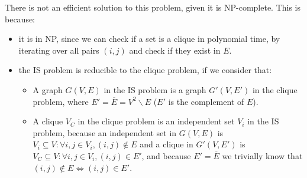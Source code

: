 \documentclass{cal}
\begin{document}
{There is not an efficient solution to this problem, given it is NP-complete. This is because:
\begin{itemize}
    \item it is in NP, since we can check if a set is a clique in polynomial time, by iterating over all pairs $(i,j)$ and check if they exist in $E$.
    \item the IS problem is reducible to the clique problem, if we consider that:
    \begin{itemize}
        \item A graph $G(V,E)$ in the IS problem is a graph $G'(V,E')$ in the clique problem, where $E' = \overline{E} = V^2 \backslash E$ ($E'$ is the complement of $E$).
        \item A clique $V_C$ in the clique problem is an independent set $V_i$ in the IS problem, because an independent set in $G(V,E)$ is $V_i \subseteq V : \forall i, j \in V_i, (i,j) \not \in E$ and a clique in $G'(V,E')$ is $V_C \subseteq V : \forall i, j \in V_i, (i,j) \in E'$, and because $E'=\overline{E}$ we trivially know that $(i,j) \not \in E \iff (i,j) \in E'$.
    \end{itemize}
\end{itemize}

}
\end{document}
